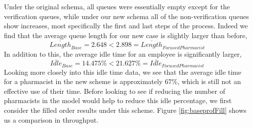 \documentclass[10pt]{report}            %
\begin{document}
Under the original schema, all queues were essentially empty except for the verification queues, while under our new schema all of the non-verification queues show increases, most specifically the first and last steps of the process. Indeed we find that the average queue length for our new case is slightly larger than before,
\[\overline{Length}_{Base}=2.648<2.898=\overline{Length}_{Focused Pharmacist}\]
In addition to this, the average idle time for an employee is significantly larger,
\[\overline{Idle}_{Base}=14.475\% < 21.627\%=\overline{Idle}_{Focused Pharmacist}\]
Looking more closely into this idle time data, we see that the average idle time for a pharmacist in the new scheme is approximately $67\%$, which is still not an effective use of their time. Before looking to see if reducing the number of pharmacists in the model would help to reduce this idle percentage, we first consider the filled order results under this scheme. Figure \ref{fig:baseprofFill} shows us a comparison in throughput.
\end{document}
